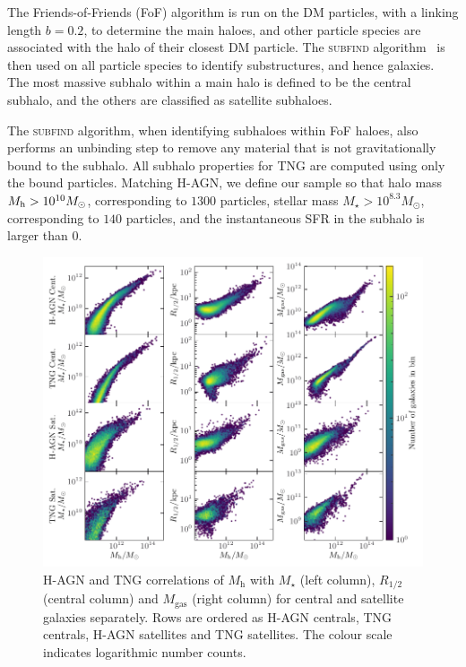 \documentclass[useAMS,usenatbib]{mnras}
\begin{document}
The Friends-of-Friends (FoF) algorithm is run on the \ac{DM} particles, with a linking length $b=0.2$, to determine the main haloes, and other particle species are associated with the halo of their closest \ac{DM} particle. The \textsc{subfind} algorithm~\citep{Springel_2001,Dolag_2009} is then used on all particle species to identify substructures, and hence galaxies. The most massive subhalo within a main halo is defined to be the central subhalo, and the others are classified as satellite subhaloes.

The \textsc{subfind} algorithm, when identifying subhaloes within FoF haloes, also performs an unbinding step to remove any material that is not gravitationally bound to the subhalo. All subhalo properties for TNG are computed using only the bound particles. Matching H-AGN, we define our sample so that halo mass $M_{\rm h} > 10^{10} M_\odot$, corresponding to $1300$ particles, stellar mass $M_\star > 10^{8.3} M_\odot$, corresponding to $140$ particles, and the instantaneous SFR in the subhalo is larger than $0$.

\begin{figure}
    \centering
    \includegraphics[width=\textwidth]{Figures/sim_data.pdf}
    \caption{H-AGN and TNG correlations of $M_\mathrm{h}$ with $M_\star$ (left column), $R_{1/2}$ (central column) and $M_\mathrm{gas}$ (right column) for central and satellite galaxies separately. Rows are ordered as H-AGN centrals, TNG centrals, H-AGN satellites and TNG satellites. The colour scale indicates logarithmic number counts.}
    \label{fig:sim_data}
\end{figure}
\end{document}
